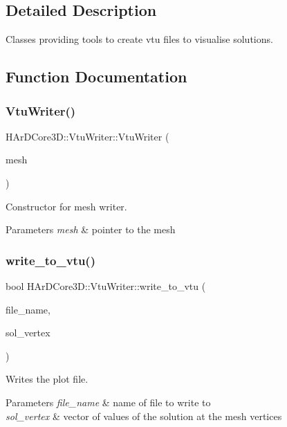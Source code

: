 \subsection{Detailed Description}
Classes providing tools to create vtu files to visualise solutions. 



\subsection{Function Documentation}
\mbox{\label{group__Plot_ga7aff33c21507345fcaa46515ed006470}} 
\subsubsection{\texorpdfstring{Vtu\+Writer()}{VtuWriter()}}
{\footnotesize\ttfamily H\+Ar\+D\+Core3\+D\+::\+Vtu\+Writer\+::\+Vtu\+Writer (\begin{DoxyParamCaption}\item[{\hyperlink{classHArDCore3D_1_1Mesh}{Mesh} $\ast$}]{mesh }\end{DoxyParamCaption})}



Constructor for mesh writer. 


\begin{DoxyParams}{Parameters}
{\em mesh} & pointer to the mesh \\
\hline
\end{DoxyParams}
\mbox{\label{group__Plot_ga11ec3bf54886e6570bfe72daf3f41a5d}} 
\subsubsection{\texorpdfstring{write\+\_\+to\+\_\+vtu()}{write\_to\_vtu()}}
{\footnotesize\ttfamily bool H\+Ar\+D\+Core3\+D\+::\+Vtu\+Writer\+::write\+\_\+to\+\_\+vtu (\begin{DoxyParamCaption}\item[{const std\+::string}]{file\+\_\+name,  }\item[{const Eigen\+::\+Vector\+Xd \&}]{sol\+\_\+vertex }\end{DoxyParamCaption})}



Writes the plot file. 


\begin{DoxyParams}{Parameters}
{\em file\+\_\+name} & name of file to write to \\
\hline
{\em sol\+\_\+vertex} & vector of values of the solution at the mesh vertices \\
\hline
\end{DoxyParams}
